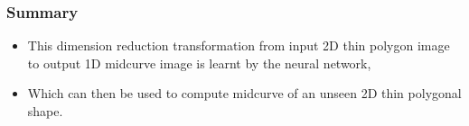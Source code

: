 \begin{frame}[fragile]\frametitle{Summary}
	\begin{itemize}
	\item This dimension reduction transformation from input 2D thin polygon image to output 1D midcurve image is learnt by the neural network,
	\item Which can then be used to compute midcurve of an unseen 2D thin polygonal shape.
	\end{itemize}	
\end{frame}
